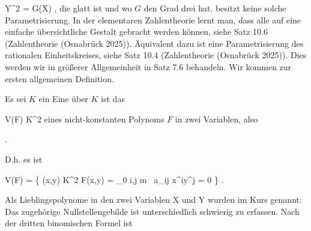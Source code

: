 \mavergleichskette
{\vergleichskette
{Y^2
}
{ = }{G(X)
}
{  }{
}
{    }{
}
{   }{
}
}
{}{}{,}
die glatt ist und wo $G$ den Grad drei hat, besitzt keine solche Parametrisierung. In der elementaren Zahlentheorie lernt man, dass alle  {} auf eine einfache übersichtliche Gestalt gebracht werden können, siehe
Satz 10.6 (Zahlentheorie (Osnabrück 2025)).
Äquivalent dazu ist eine
 {} {}
Parametrisierung des rationalen Einheitskreises, siehe
Satz 10.4 (Zahlentheorie (Osnabrück 2025)).
Dies werden wir in größerer Allgemeinheit in
Satz 7.6
behandeln.
Wir kommen zur ersten allgemeinen Definition.


{}
{
Es sei $K$ ein
Eine  über $K$ ist das

\mavergleichskette
{\vergleichskette
{V(F)
}
{ \subseteq }{ K^2
}
{  }{
}
{    }{
}
{   }{
}
}
{}{}{}
eines nicht-konstanten Polynoms $F$ in zwei Variablen, also

 { . }

D.h. es ist

\mavergleichskettedisphandlinks
{\vergleichskettedisphandlinks
{ V(F)
}
{ =} { \left\{  (x,y) \in K^2   \mid   F(x,y) = \sum_{0 \leq i,j \leq m} \, a_{ij} x^{i}y^{j} = 0         \right\}
}
{ } {
}
{ } {
}
{ } {
}
}
{}{}{.}

}
Als Lieblingspolynome in den zwei Variablen
\mathkor {} {X} {und} {Y} {}
wurden im Kurs genannt:
 { }
Das zugehörige Nullstellengebilde
 ist unterschiedlich schwierig zu erfassen. Nach der dritten binomischen Formel ist

